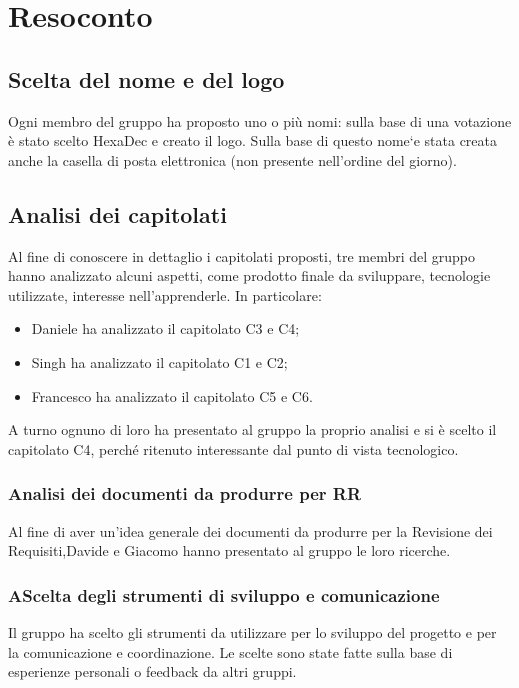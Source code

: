 \section{Resoconto}
\subsection{Scelta del nome e del logo}
Ogni membro del gruppo ha proposto uno o più nomi: sulla base di una votazione è stato scelto HexaDec e creato il logo. Sulla base di questo nome`e stata creata anche la casella di posta elettronica \groupEmail (non presente nell’ordine del giorno).

\subsection{Analisi dei capitolati}
Al fine di conoscere in dettaglio i capitolati proposti, tre membri del gruppo hanno analizzato alcuni aspetti, come prodotto finale da sviluppare, tecnologie utilizzate, interesse nell’apprenderle. In particolare:
\begin{itemize}
    \item Daniele ha analizzato il capitolato C3 e C4;
    \item Singh ha analizzato il capitolato C1 e C2;
    \item Francesco ha analizzato il capitolato C5 e C6.
\end{itemize}
A turno ognuno di loro ha presentato al gruppo la proprio analisi e si è scelto il capitolato C4, perché ritenuto interessante dal punto di vista tecnologico.

\subsubsection{Analisi dei documenti da produrre per RR}
Al fine di aver un’idea generale dei documenti da produrre per la Revisione dei Requisiti,Davide e Giacomo hanno presentato al gruppo le loro ricerche.

\subsubsection{AScelta degli strumenti di sviluppo e comunicazione}
Il gruppo ha scelto gli strumenti da utilizzare per lo sviluppo del progetto e per la comunicazione e coordinazione. Le scelte sono state fatte sulla base di esperienze personali o feedback da altri gruppi.